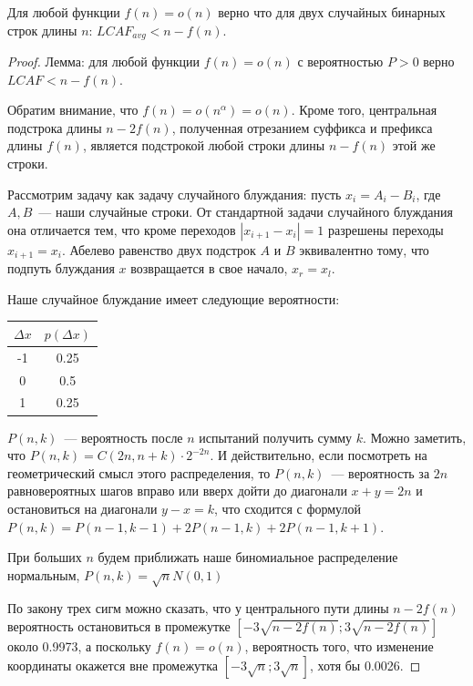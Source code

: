 \begin{theorem}
Для любой функции $f(n)=o(n)$ верно что для двух случайных бинарных строк длины $n$: $LCAF_{avg} < n - f(n)$.
\end{theorem}
\begin{proof}

Лемма: для любой функции $f(n)=o(n)$ с вероятностью $P>0$ верно $LCAF < n - f(n)$.

Обратим внимание, что $f(n) = o(n^\alpha) = o(n)$. Кроме того, центральная подстрока длины $n-2f(n)$, полученная отрезанием суффикса и префикса длины $f(n)$, является подстрокой любой строки длины $n-f(n)$ этой же строки.

Рассмотрим задачу как задачу случайного блуждания: пусть $x_i = A_i - B_i$, где $A, B$~--- наши случайные строки. От стандартной задачи случайного блуждания она отличается тем, что кроме переходов $|x_{i+1}-x_i|=1$ разрешены переходы $x_{i+1}=x_i$. Абелево равенство двух подстрок $A$ и $B$ эквивалентно тому, что подпуть блуждания $x$ возвращается в свое начало, $x_r=x_l$.

Наше случайное блуждание имеет следующие вероятности:

\begin{tabular}{|c|c|}
\hline
$\Delta x$ & $p(\Delta x)$ \\
\hline
-1 & 0.25 \\
\hline
0 & 0.5 \\
\hline
1 & 0.25 \\
\hline
\end{tabular}

$P(n, k)$~--- вероятность после $n$ испытаний получить сумму $k$. Можно заметить, что $P(n, k)=C(2n, n+k)\cdot 2^{-2n}$. И действительно, если посмотреть на геометрический смысл этого распределения, то $P(n,k)$~--- вероятность за $2n$ равновероятных шагов вправо или вверх дойти до диагонали $x+y=2n$ и остановиться на диагонали $y-x=k$, что сходится с формулой $P(n,k)=P(n-1,k-1)+2P(n-1,k)+2P(n-1,k+1)$.

При больших $n$ будем приближать наше биномиальное распределение нормальным, $P(n, k)=\sqrt n N(0,1)$ %

По закону трех сигм можно сказать, что у центрального пути длины $n-2f(n)$ вероятность остановиться в промежутке $[-3\sqrt{n-2f(n)}; 3\sqrt{n-2f(n)}]$ около 0.9973, а поскольку $f(n)=o(n)$, вероятность того, что изменение координаты окажется вне промежутка $[-3\sqrt{n}; 3\sqrt{n}]$, хотя бы 0.0026. %


\end{proof}
